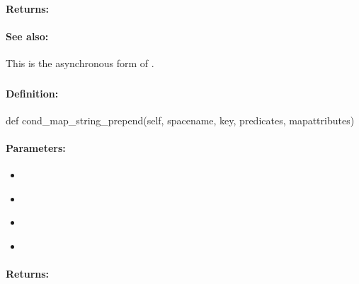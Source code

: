 \paragraph{Returns:}


\paragraph{See also:}  This is the asynchronous form of .

\pagebreak
\subsubsection{}
\label{api:python:cond_map_string_prepend}


\paragraph{Definition:}
\begin{pythoncode}
def cond_map_string_prepend(self, spacename, key, predicates, mapattributes)
\end{pythoncode}

\paragraph{Parameters:}
\begin{itemize}[noitemsep]
\item {}\\

\item {}\\

\item {}\\

\item {}\\

\end{itemize}

\paragraph{Returns:}


